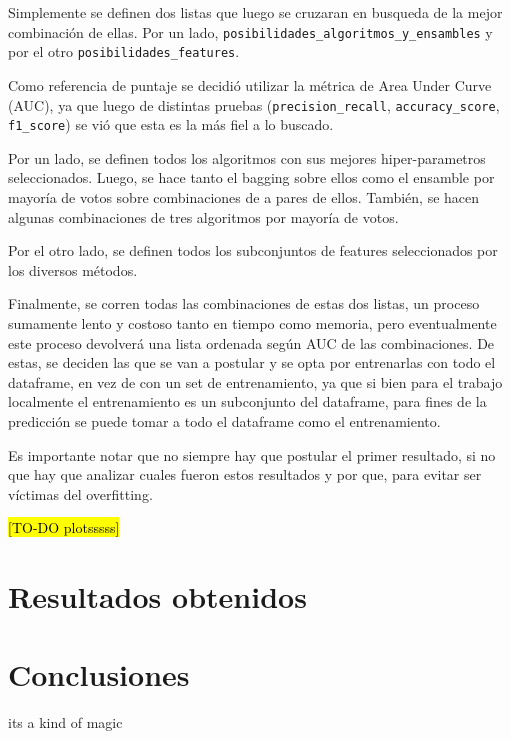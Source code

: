 \documentclass[a4paper]{article}
\begin{document}
Simplemente se definen dos listas que luego se cruzaran en busqueda de la mejor combinación de ellas. Por un lado, \texttt{posibilidades\_algoritmos\_y\_ensambles} y por el otro \texttt{posibilidades\_features}.

Como referencia de puntaje se decidió utilizar la métrica de Area Under Curve (AUC), ya que luego de distintas pruebas (\texttt{precision\_recall}, \texttt{accuracy\_score}, \texttt{f1\_score}) se vió que esta es la más fiel a lo buscado.

Por un lado, se definen todos los algoritmos con sus mejores hiper-parametros seleccionados. Luego, se hace tanto el bagging sobre ellos como el ensamble por mayoría de votos sobre combinaciones de a pares de ellos. También, se hacen algunas combinaciones de tres algoritmos por mayoría de votos.

Por el otro lado, se definen todos los subconjuntos de features seleccionados por los diversos métodos.

Finalmente, se corren todas las combinaciones de estas dos listas, un proceso sumamente lento y costoso tanto en tiempo como memoria, pero eventualmente este proceso devolverá una lista ordenada según AUC de las combinaciones. De estas, se deciden las que se van a postular y se opta por entrenarlas con todo el dataframe, en vez de con un set de entrenamiento, ya que si bien para el trabajo localmente el entrenamiento es un subconjunto del dataframe, para fines de la predicción se puede tomar a todo el dataframe como el entrenamiento.

Es importante notar que no siempre hay que postular el primer resultado, si no que hay que analizar cuales fueron estos resultados y por que, para evitar ser víctimas del overfitting. 

\hl{[TO-DO plotsssss]}

\section{Resultados obtenidos}

\section{Conclusiones}
its a kind of magic
\end{document}

